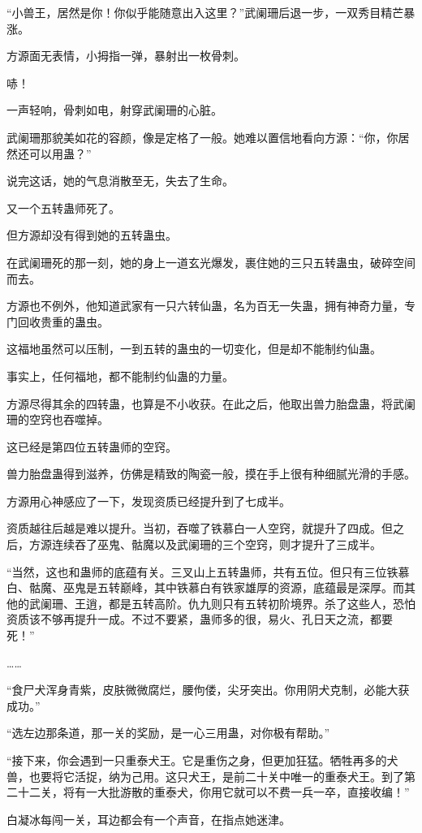 \begin{this_body}
“小兽王，居然是你！你似乎能随意出入这里？”武阑珊后退一步，一双秀目精芒暴涨。

方源面无表情，小拇指一弹，暴射出一枚骨刺。

哧！

一声轻响，骨刺如电，射穿武阑珊的心脏。

武阑珊那貌美如花的容颜，像是定格了一般。她难以置信地看向方源：“你，你居然还可以用蛊？”

说完这话，她的气息消散至无，失去了生命。

又一个五转蛊师死了。

但方源却没有得到她的五转蛊虫。

在武阑珊死的那一刻，她的身上一道玄光爆发，裹住她的三只五转蛊虫，破碎空间而去。

方源也不例外，他知道武家有一只六转仙蛊，名为百无一失蛊，拥有神奇力量，专门回收贵重的蛊虫。

这福地虽然可以压制，一到五转的蛊虫的一切变化，但是却不能制约仙蛊。

事实上，任何福地，都不能制约仙蛊的力量。

方源尽得其余的四转蛊，也算是不小收获。在此之后，他取出兽力胎盘蛊，将武阑珊的空窍也吞噬掉。

这已经是第四位五转蛊师的空窍。

兽力胎盘蛊得到滋养，仿佛是精致的陶瓷一般，摸在手上很有种细腻光滑的手感。

方源用心神感应了一下，发现资质已经提升到了七成半。

资质越往后越是难以提升。当初，吞噬了铁慕白一人空窍，就提升了四成。但之后，方源连续吞了巫鬼、骷魔以及武阑珊的三个空窍，则才提升了三成半。

“当然，这也和蛊师的底蕴有关。三叉山上五转蛊师，共有五位。但只有三位铁慕白、骷魔、巫鬼是五转巅峰，其中铁慕白有铁家雄厚的资源，底蕴最是深厚。而其他的武阑珊、王逍，都是五转高阶。仇九则只有五转初阶境界。杀了这些人，恐怕资质该不够再提升一成。不过不要紧，蛊师多的很，易火、孔日天之流，都要死！”

……

“食尸犬浑身青紫，皮肤微微腐烂，腰佝偻，尖牙突出。你用阴犬克制，必能大获成功。”

“选左边那条道，那一关的奖励，是一心三用蛊，对你极有帮助。”

“接下来，你会遇到一只重泰犬王。它是重伤之身，但更加狂猛。牺牲再多的犬兽，也要将它活捉，纳为己用。这只犬王，是前二十关中唯一的重泰犬王。到了第二十二关，将有一大批游散的重泰犬，你用它就可以不费一兵一卒，直接收编！”

白凝冰每闯一关，耳边都会有一个声音，在指点她迷津。


\end{this_body}

